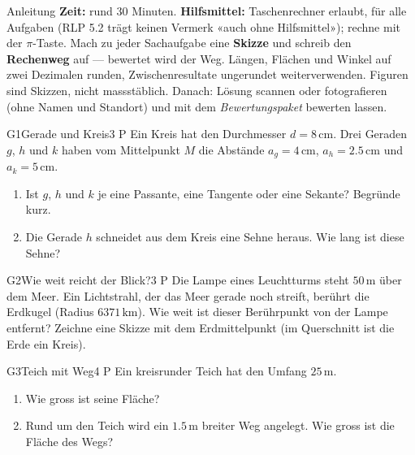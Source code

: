 \documentclass[11pt]{article}
\begin{document}

\begin{lpinfo}{Anleitung}
\textbf{Zeit:} rund 30 Minuten. \textbf{Hilfsmittel:} Taschenrechner erlaubt, für alle Aufgaben (RLP 5.2 trägt keinen Vermerk
«auch ohne Hilfsmittel»); rechne mit der $\pi$-Taste. Mach zu jeder Sachaufgabe eine \textbf{Skizze} und schreib den
\textbf{Rechenweg} auf — bewertet wird der Weg. Längen, Flächen und Winkel auf zwei Dezimalen runden, Zwischenresultate ungerundet
weiterverwenden. Figuren sind Skizzen, nicht massstäblich.
Danach: Lösung scannen oder fotografieren (ohne Namen und Standort) und mit dem \emph{Bewertungspaket} bewerten lassen.
\end{lpinfo}


\begin{lpaufgabe}{G1}{Gerade und Kreis}{3 P}
Ein Kreis hat den Durchmesser $d = 8\,\text{cm}$. Drei Geraden $g$, $h$ und $k$ haben vom Mittelpunkt $M$ die Abstände
$a_g = 4\,\text{cm}$, $a_h = 2.5\,\text{cm}$ und $a_k = 5\,\text{cm}$.
\begin{enumerate}[label=(\alph*),leftmargin=*,itemsep=2pt]
\item Ist $g$, $h$ und $k$ je eine Passante, eine Tangente oder eine Sekante? Begründe kurz.
\item Die Gerade $h$ schneidet aus dem Kreis eine Sehne heraus. Wie lang ist diese Sehne?
\end{enumerate}
\end{lpaufgabe}

\begin{lpaufgabe}{G2}{Wie weit reicht der Blick?}{3 P}
Die Lampe eines Leuchtturms steht $50\,\text{m}$ über dem Meer. Ein Lichtstrahl, der das Meer gerade noch streift, berührt die
Erdkugel (Radius $6371\,\text{km}$). Wie weit ist dieser Berührpunkt von der Lampe entfernt? Zeichne eine Skizze mit dem
Erdmittelpunkt (im Querschnitt ist die Erde ein Kreis).
\end{lpaufgabe}

\begin{lpaufgabe}{G3}{Teich mit Weg}{4 P}
Ein kreisrunder Teich hat den Umfang $25\,\text{m}$.
\begin{enumerate}[label=(\alph*),leftmargin=*,itemsep=2pt]
\item Wie gross ist seine Fläche?
\item Rund um den Teich wird ein $1.5\,\text{m}$ breiter Weg angelegt. Wie gross ist die Fläche des Wegs?
\end{enumerate}
\end{lpaufgabe}
\end{document}
